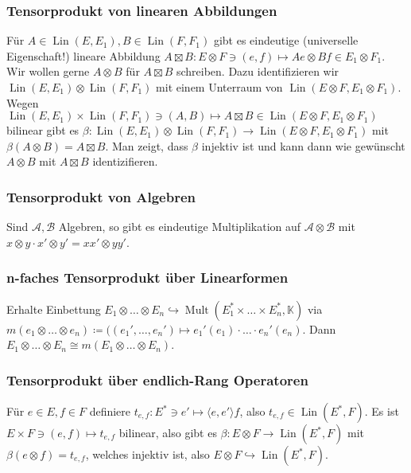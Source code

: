\documentclass[11pt,a4paper]{scrartcl}
\newcommand{\K}{\mathbb{K}} %
\newcommand{\A}{\mathcal{A}}
\newcommand{\B}{\mathcal{B}}
\theoremstyle{plain}
\theoremstyle{definition}
\theoremstyle{remark}
\DeclareMathOperator{\Lin}{Lin}
\DeclareMathOperator{\Mult}{Mult}
\begin{document}
\subsubsection{Tensorprodukt von linearen Abbildungen}

Für $A\in \Lin(E,E_1), B\in \Lin(F,F_1)$ gibt es eindeutige (universelle Eigenschaft!) lineare Abbildung $A\boxtimes B: E\otimes F \ni (e,f)\mapsto Ae\otimes Bf \in E_1\otimes F_1$. Wir wollen gerne $A\otimes B$ für $A\boxtimes B$ schreiben. Dazu identifizieren wir $\Lin(E,E_1)\otimes \Lin(F,F_1)$ mit einem Unterraum von $\Lin(E\otimes F, E_1\otimes F_1)$. Wegen $\Lin(E,E_1)\times \Lin(F,F_1) \ni (A,B) \mapsto A\boxtimes B \in \Lin(E\otimes F, E_1\otimes F_1)$ bilinear gibt es $\beta: \Lin(E,E_1)\otimes \Lin(F,F_1) \to \Lin(E\otimes F, E_1\otimes F_1)$ mit $\beta(A\otimes B) = A\boxtimes B$. Man zeigt, dass $\beta$ injektiv ist und kann dann wie gewünscht $A\otimes B$ mit $A\boxtimes B$ identizifieren.

\subsubsection{Tensorprodukt von Algebren}

Sind $\A,\B$ Algebren, so gibt es eindeutige Multiplikation auf $\A\otimes \B$ mit $x\otimes y \cdot x'\otimes y' = xx'\otimes yy'$.

\subsubsection{n-faches Tensorprodukt über Linearformen}

Erhalte Einbettung $E_1\otimes \dots \otimes E_n \hookrightarrow \Mult(E_1^*\times \dots \times E_n^*, \K)$ via $m(e_1\otimes \dots \otimes e_n) \coloneqq ((e_1', \dots, e_n')\mapsto e_1'(e_1)\cdot \dots \cdot e_n'(e_n)$. Dann $E_1\otimes \dots \otimes E_n \cong m(E_1\otimes \dots \otimes E_n)$.

\subsubsection{Tensorprodukt über endlich-Rang Operatoren}

Für $e\in E, f\in F$ definiere $t_{e,f}: E^*\ni e' \mapsto \langle e, e' \rangle f$, also $t_{e,f}\in \Lin(E^*,F)$. Es ist $E\times F \ni (e,f) \mapsto t_{e,f}$ bilinear, also gibt es $\beta: E\otimes F \to \Lin(E^*,F)$ mit $\beta(e\otimes f) = t_{e,f}$, welches injektiv ist, also $E\otimes F \hookrightarrow \Lin(E^*,F)$.
\end{document}
